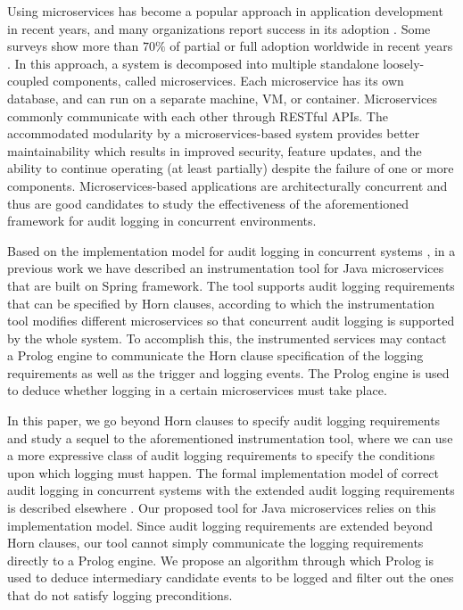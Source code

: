 Using microservices has become a popular approach in application development in recent years, and many organizations report success in its adoption \cite{Reilly}. Some surveys show more than $70\%$ of partial or full adoption worldwide in recent years \cite{Statista}. In this approach, a system is decomposed into multiple standalone loosely-coupled components, called microservices. Each microservice has its own database, and can run on a separate machine, VM, or container. Microservices commonly communicate with each other through RESTful APIs. The accommodated  modularity by a microservices-based system provides better maintainability which results in improved security, feature updates, and the ability to continue operating (at least partially)  despite the failure of one or more components. Microservices-based applications are architecturally concurrent and thus are good candidates to study the effectiveness of the aforementioned framework for audit logging in concurrent environments. 

Based on the implementation model for audit logging in concurrent systems \cite{lsfa20}, in a previous work \cite{stpsa21} we have described an instrumentation tool for Java microservices that are built on Spring framework. The tool supports audit logging requirements that can be specified by Horn clauses, according to which the instrumentation tool modifies different microservices so that concurrent audit logging is supported by the whole system. To accomplish this, the instrumented services may contact a Prolog engine to communicate the Horn clause specification of the logging requirements as well as the trigger and logging events. The Prolog engine is used to deduce whether logging in a certain microservices must take place. 

In this paper, we go beyond Horn clauses to specify audit logging requirements and study a sequel to the aforementioned instrumentation tool, where we can use a more expressive class of audit logging requirements to specify the conditions upon which logging must happen. The formal implementation model of correct audit logging in concurrent systems with the extended audit logging requirements is described elsewhere \cite{amirmoh-tr21}. Our proposed tool for Java microservices relies on this implementation model. Since audit logging requirements are extended beyond Horn clauses, our tool cannot simply communicate the logging requirements directly to a Prolog engine. We propose an algorithm through which Prolog is used to deduce intermediary candidate events to be logged and  filter out the ones that do not satisfy logging preconditions.

